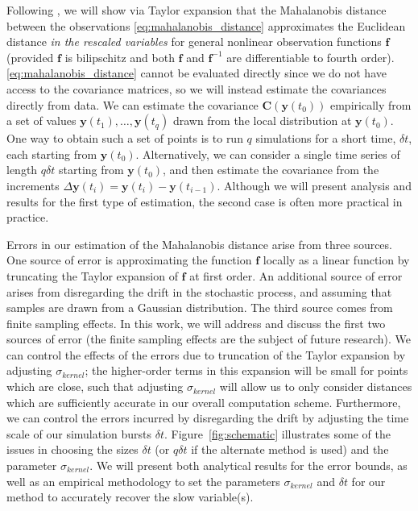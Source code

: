Following \cite{singer2008non}, we will show via Taylor expansion that the Mahalanobis distance between the observations \eqref{eq:mahalanobis_distance} approximates the Euclidean
distance {\em in the rescaled variables} for general nonlinear observation functions $\mathbf{f}$ (provided $\mathbf{f}$ is bilipschitz and both $\mathbf{f}$ and $\mathbf{f}^{-1}$ are differentiable to fourth order).
%
\eqref{eq:mahalanobis_distance} cannot be evaluated directly since we do not have access to the covariance matrices, so we will instead estimate the covariances directly from data.
%
We can estimate the covariance $\mathbf{C}(\mathbf{y}(t_0))$ empirically from a set of values $\mathbf{y}(t_1), \dots, \mathbf{y}(t_q)$ drawn from the local distribution at $\mathbf{y}(t_0)$.
%
One way to obtain such a set of points is to run $q$ simulations for a short time, $\delta t$, each starting from $\mathbf{y}(t_0)$.
%
Alternatively, we can consider a single time series of length $q \delta t$ starting from $\mathbf{y}(t_0)$, and then estimate the covariance
from the increments $\Delta \mathbf{y}(t_i) = \mathbf{y}(t_i) -\mathbf{y}(t_{i-1})$.
%
Although we will present analysis and results for the first type of estimation, the second case is often more practical in practice.
%

Errors in our estimation of the Mahalanobis distance arise from three sources.
%
One source of error is approximating the function $\mathbf{f}$ locally as a linear function by truncating the Taylor expansion of $\mathbf{f}$ at first order.
%
An additional source of error arises from disregarding the drift in the stochastic process, and assuming that samples are drawn from a Gaussian distribution.
%
The third source comes from finite sampling effects.
%
In this work, we will address and discuss the first two sources of error (the finite sampling effects are the subject of future research).
%
We can control the effects of the errors due to truncation of the Taylor expansion by adjusting $\sigma_{kernel}$; the higher-order terms in this expansion will be small for points which are close, such that adjusting $\sigma_{kernel}$ will allow us to only consider distances which are
sufficiently accurate in our overall computation scheme.
%
Furthermore, we can control the errors incurred by disregarding the drift by adjusting the time scale of our simulation bursts $\delta t$.
%
Figure~\ref{fig:schematic} illustrates some of the issues in choosing the sizes $\delta t$ (or $q \delta t$ if the alternate method is used) and the parameter $\sigma_{kernel}$.
%
We will present both analytical results for the error bounds, as well as an empirical methodology to set the parameters $\sigma_{kernel}$ and $\delta t$ for our method to accurately recover the slow variable(s).

